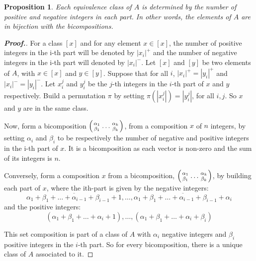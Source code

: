 \documentclass[11pt,reqno]{amsart}
\numberwithin{equation}{section}
\newtheorem{prop}[theorem]{Proposition}
\begin{document}
\begin{prop}
Each equivalence class of $A$ is determined by the number of positive and negative integers in 
each part. In other words, the elements of $A$ are in bijection with the bicompositions.
\end{prop}
\begin{proof}[\bf Proof.]
For a class $[x]$ and for any element $x\in[x]$, the number of positive integers in the i-th part will be denoted by $|x_i|^+$ and the number of negative integers in the i-th part will denoted by $|x_i|^-$. Let $[x]$ and $[y]$ be two elements of $A$, with $x\in [x]$ and $y\in [y]$. Suppose that for all $i$, $|x_i|^+=|y_i|^+$ and $|x_i|^-=|y_i|^-$. Let $x_i^j$ and $y_i^j$ be the $j$-th integers in the $i$-th part of $x$ and $y$ respectively. Build a permutation $\pi$ by setting $\pi(|x_i^j|)=|y_i^j|$, for all $i,j$. So $x$ and $y$ are in the same class.

Now, form a bicomposition $\Bigl{(}{\alpha_1 \atop \beta_1}\dots {\alpha_k \atop \beta_k}\Bigr{)}$, from a composition $x$ of $n$ integers, by setting $\alpha_i$ and $\beta_i$ to be respectively the number of negative and positive integers in the i-th part of $x$. It is a bicomposition as each vector is non-zero and the sum of its integers is $n$.

Conversely, form a composition $x$ from a bicomposition, $\Bigl{(}{\alpha_1 \atop \beta_1}\dots {\alpha_k \atop \beta_k}\Bigr{)}$, by building each part of $x$, where the ith-part is given by the negative integers:
$$\overline{\alpha_1+\beta_1+\dots+ \alpha_{i-1}+\beta_{i-1}+1}, \dots ,\overline{\alpha_1+\beta_1+\dots+ \alpha_{i-1}+\beta_{i-1}+\alpha_i}$$
and the positive integers:
$$(\alpha_1+\beta_1+\dots+ \alpha_{i}+1),\dots ,(\alpha_1+\beta_1+\dots+ \alpha_{i}+\beta_i)$$

This set composition is part of a class of $A$ with $\alpha_i$ negative integers and $\beta_i$ positive integers in the $i$-th part. So for every bicomposition, there is a unique class of $A$ associated to it.
\end{proof}
\end{document}
